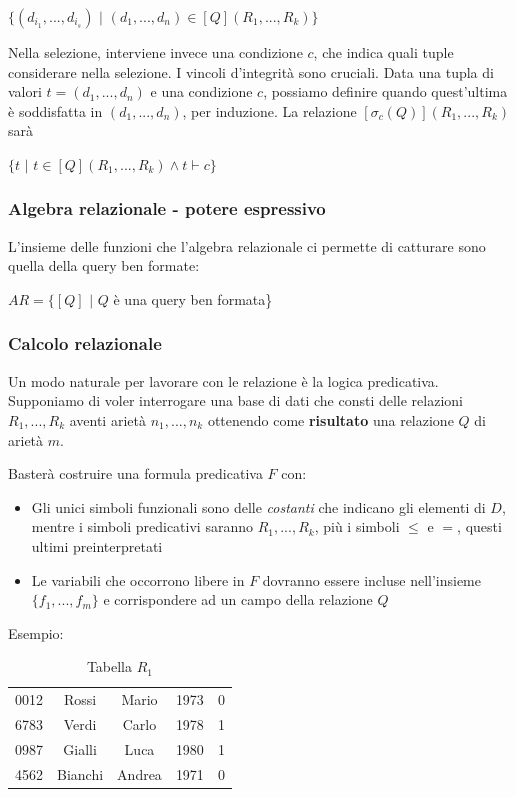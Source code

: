 \documentclass{article}
\begin{document}
$\{(d_{i_1},...,d_{i_s})\,\,|\,\,(d_1,...,d_n)\in[Q](R_1,...,R_k)\}$

\bigskip

Nella selezione, interviene invece una condizione $c$, che indica quali tuple considerare nella selezione. I vincoli d'integrità sono cruciali. Data una tupla di valori $t=(d_1,...,d_n)$ e una condizione $c$, possiamo definire quando quest'ultima è soddisfatta in $(d_1,...,d_n)$, per induzione. La relazione $[\sigma_c(Q)](R_1,...,R_k)$ sarà

$\{t\,\,|\,\, t \in[Q](R_1,...,R_k)\land t\vdash c\}$


\subsubsection{Algebra relazionale - potere espressivo}
L'insieme delle funzioni che l'algebra relazionale ci permette di catturare sono quella della query ben formate:

$AR=\{[Q]\,\,|\,\,Q$ è una query ben formata\}

\subsubsection{Calcolo relazionale}
Un modo naturale per lavorare con le relazione è la logica predicativa. Supponiamo di voler interrogare una base di dati che consti delle relazioni $R_1,...,R_k$ aventi arietà $n_1,...,n_k$ ottenendo come \textbf{risultato} una relazione $Q$ di arietà $m$.

\bigskip

Basterà costruire una formula predicativa $F$ con:
\begin{itemize}
    \item Gli unici simboli funzionali sono delle \textit{costanti} che indicano gli elementi di $D$, mentre i simboli predicativi saranno $R_1,...,R_k$, più i simboli $\leq$ e $=$, questi ultimi preinterpretati
    \item Le variabili che occorrono libere in $F$ dovranno essere incluse nell'insieme $\{f_1,...,f_m\}$ e corrispondere ad un campo della relazione $Q$
\end{itemize}

Esempio:

\begin{table}[!ht]
    \centering
    \begin{tabular}{|ccccc|}
    \hline \hline
        0012 & Rossi & Mario & 1973 & 0 \\
        6783 & Verdi & Carlo & 1978 & 1 \\
        0987 & Gialli & Luca & 1980 & 1 \\
        4562 & Bianchi & Andrea & 1971 & 0 \\
        \hline\hline
    \end{tabular}
    \caption{Tabella $R_1$}
    \label{tab:r1}
\end{table}
\end{document}
